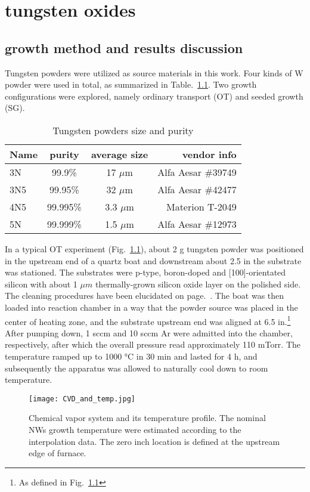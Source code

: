
\chapter{tungsten oxides}

 


\section{growth method and results discussion}

Tungsten powders were utilized as source materials in this work. Four kinds of W powder were used in total, as summarized in Table.~\ref{tab:powder}. Two growth configurations were explored, namely ordinary transport (OT) and seeded growth (SG).
\begin{table}
\centering
\caption{Tungsten powders size and purity}\label{tab:powder}
\begin{tabular}{lccr}
\toprule
Name & purity & average size & vendor info\\
\midrule
3N   &  99.9\% & 17 $\mu$m & Alfa Aesar \#39749\\
3N5   &  99.95\% & 32 $\mu$m  & Alfa Aesar \#42477\\
4N5   &  99.995\% & 3.3 $\mu$m  & Materion T-2049 \\
5N   &  99.999\% & 1.5 $\mu$m & Alfa Aesar \#12973\\
\bottomrule
\end{tabular}
\end{table}

In a typical OT experiment (Fig.~\ref{fig:wogrow}), about 2 g tungsten powder was positioned in the upstream end of a quartz boat and downstream about 2.5 in the substrate was stationed. The substrates were p-type, boron-doped and [100]-orientated silicon with about 1 $\mu m$ thermally-grown silicon oxide layer on the polished side. The cleaning procedures have been elucidated on page.~\pageref{ch2sub}. The boat was then loaded into reaction chamber in a way that the powder source was placed in the center of heating zone, and the substrate upstream end was aligned at 6.5 in.\footnote{As defined in Fig.~\ref{fig:wogrow}} After pumping down, 1 sccm  and 10 sccm Ar were admitted into the chamber, respectively, after which the overall pressure read approximately 110 mTorr. The temperature ramped up to 1000 \si{\degreeCelsius} in 30 min and lasted for 4 h, and subsequently the apparatus was allowed to naturally cool down to room temperature.
\begin{figure}[htb]
\centering
\texttt{[image: CVD\_and\_temp.jpg]}
\caption[ NW growth: OT]{Chemical vapor system and its temperature profile. The nominal NWs growth temperature were estimated according to the interpolation data. The zero inch location is defined at the upstream edge of furnace.}
\label{fig:wogrow}
\end{figure}


